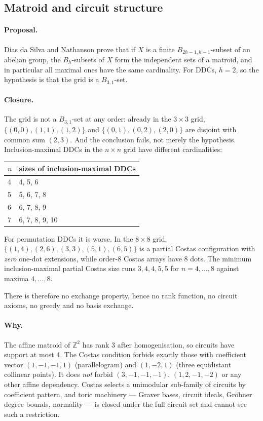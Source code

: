 \documentclass[11pt,a4paper]{article}
\theoremstyle{definition}
\newcommand{\Z}{\mathbb{Z}}
\begin{document}
\subsection{Matroid and circuit structure}
\label{sec:matroid}

\paragraph{Proposal.} Dias da Silva and Nathanson prove that if $X$ is a finite
$B_{2h-1,h-1}$-subset of an abelian group, the $B_h$-subsets of $X$ form the
independent sets of a matroid, and in particular all maximal ones have the same
cardinality. For DDCs, $h=2$, so the hypothesis is that the grid is a
$B_{3,1}$-set.

\paragraph{Closure.} The grid is not a $B_{3,1}$-set at any order: already in the
$3\times3$ grid, $\{(0,0),(1,1),(1,2)\}$ and $\{(0,1),(0,2),(2,0)\}$ are disjoint
with common sum $(2,3)$. And the conclusion fails, not merely the hypothesis.
Inclusion-maximal DDCs in the $n\times n$ grid have different cardinalities:

\begin{center}
\begin{tabular}{@{}ll@{}}
\toprule
$n$ & sizes of inclusion-maximal DDCs \\
\midrule
4 & 4, 5, 6 \\
5 & 5, 6, 7, 8 \\
6 & 6, 7, 8, 9 \\
7 & 6, 7, 8, 9, 10 \\
\bottomrule
\end{tabular}
\end{center}

For permutation DDCs it is worse. In the $8\times8$ grid,
$\{(1,4),(2,6),(3,3),(5,1),(6,5)\}$ is a partial Costas configuration with
\emph{zero} one-dot extensions, while order-8 Costas arrays have 8 dots. The
minimum inclusion-maximal partial Costas size runs $3,4,4,5,5$ for $n=4,\dots,8$
against maxima $4,\dots,8$.

There is therefore no exchange property, hence no rank function, no circuit
axioms, no greedy and no basis exchange.

\paragraph{Why.} The affine matroid of $\Z^2$ has rank 3 after homogenisation, so
circuits have support at most 4. The Costas condition forbids exactly those with
coefficient vector $(1,-1,-1,1)$ (parallelogram) and $(1,-2,1)$ (three
equidistant collinear points). It does \emph{not} forbid $(3,-1,-1,-1)$,
$(1,2,-1,-2)$ or any other affine dependency. Costas selects a unimodular
sub-family of circuits by coefficient pattern, and toric machinery --- Graver
bases, circuit ideals, Gr\"obner degree bounds, normality --- is closed under the
full circuit set and cannot see such a restriction.
\end{document}
